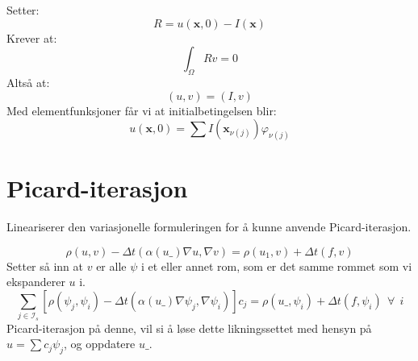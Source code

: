 \documentclass[a4paper, 10pt]{article}
\newcommand{\mb}{\mathbf}
\newcommand{\mc}{\mathcal}
\begin{document}
Setter:
\begin{equation}
	R = u(\mb{x}, 0)-I(\mb{x})
\end{equation}
Krever at:
\begin{equation}
	\int_{\Omega} Rv = 0
\end{equation}
Altså at:
\begin{equation}
	(u, v) = (I, v)
\end{equation}
Med elementfunksjoner får vi at initialbetingelsen blir:
\begin{equation}
	u(\mb{x}, 0) = \sum I(\mb{x}_{\nu(j)}) \varphi_{\nu(j)}
\end{equation}

\section{Picard-iterasjon}
Lineariserer den variasjonelle formuleringen for å kunne anvende Picard-iterasjon.

\begin{equation}
	\rho(u, v) - \Delta t (\alpha(u\_)\nabla u, \nabla v) = \rho(u_1,v) + \Delta t (f, v)
\end{equation}
Setter så inn at $v$ er alle $\psi$ i et eller annet rom, som er det samme rommet som vi ekspanderer $u$ i. 
\begin{equation}
\sum_{j \in \mc{I}_s} \left[\rho(\psi_j, \psi_i) - \Delta t (\alpha(u\_)\nabla\psi_j, \nabla\psi_i) \right]c_j	
= \rho(u\_, \psi_i)+  \Delta t (f, \psi_i) \ \ \forall \ \ i
\end{equation}
Picard-iterasjon på denne, vil si å løse dette likningssettet med hensyn på $u = \sum c_j \psi_j$, og oppdatere $u\_$. 
\end{document}
